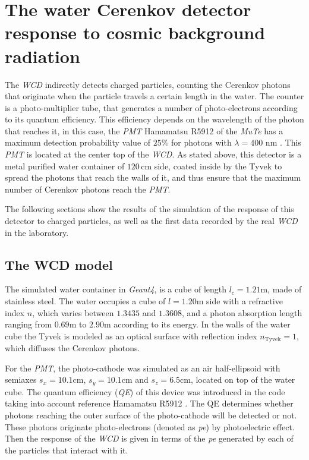 \documentclass[submitting]{nst}
\begin{document}
\section{The water Cerenkov detector response to cosmic background radiation}\label{sec:wcd-response}
The \textsl{WCD} indirectly detects charged particles, counting the Cerenkov photons that originate when the particle travels a certain length in the water. The counter is a photo-multiplier tube, that generates a number of photo-electrons according to its quantum efficiency. This efficiency depends on the wavelength of the photon that reaches it, in this case, the \textsl{PMT} Hamamatsu R5912 of the \textsl{MuTe} has a maximum detection probability value of $25$\% for photons with $\lambda = 400$ nm \cite{Hamamatsu2018}. This \textsl{PMT} is located at the center top of the \textsl{WCD}. As stated above, this detector is a metal purified water container of $120$\,cm side, coated inside by the Tyvek to spread the photons that reach the walls of it, and thus ensure that the maximum number of Cerenkov photons reach the \textsl{PMT}. 

The following sections show the results of the simulation of the response of this detector to charged particles, as well as the first data recorded by the real \textsl{WCD} in the laboratory.


\subsection{The WCD model}\label{sec:wcd-model}
The simulated water container in \textsl{Geant4}, is a cube of length $l_c=1.21$m, made of stainless steel. The water occupies a cube of $ l=1.20$m side with a refractive index $n$, which varies between $1.3435$ and $1.3608$, and a photon absorption length ranging from $0.69$m to $2.90$m according to its energy. In the walls of the water cube the Tyvek is modeled as an optical surface with reflection index $n_{\mathrm{Tyvek}} = 1 $, which diffuses the Cerenkov photons.

For the \textsl{PMT}, the photo-cathode was simulated as an air half-ellipsoid with semiaxes $s_x=10.1$cm, $ s_y = 10.1$cm and $s_z=6.5$cm, located on top of the water cube. The quantum efficiency (\textsl{QE}) of this device was introduced in the code taking into account reference Hamamatsu R5912 \cite{Hamamatsu2018}. The QE determines whether photons reaching the outer surface of the photo-cathode will be detected or not. These photons originate photo-electrons (denoted as \textsl{pe}) by photoelectric effect. Then the response of the \textsl{WCD} is given in terms of the \textsl{pe} generated by each of the particles that interact with it.
\end{document}
